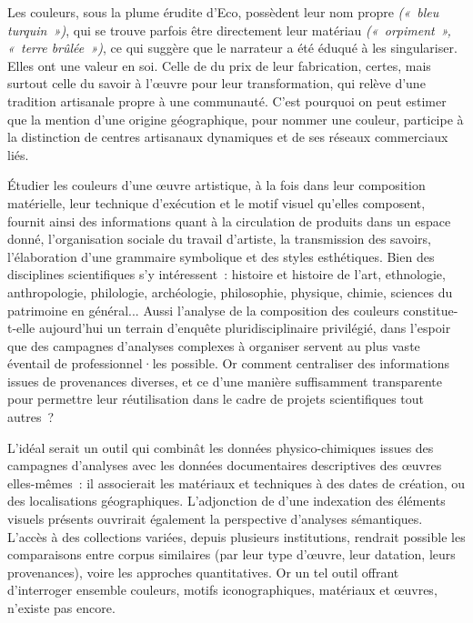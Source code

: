 \documentclass[a4paper,12pt, twoside]{book}
\begin{document}
Les couleurs, sous la plume érudite d’Eco, possèdent leur nom propre \scriptsize\textit{(«~bleu turquin~»)}\normalsize, qui se trouve parfois être directement leur matériau \scriptsize\textit{(«~orpiment~», «~terre brûlée~»)}\normalsize, ce qui suggère que le narrateur a été éduqué à les singulariser. Elles ont une valeur en soi. Celle de du prix de leur fabrication, certes, mais surtout celle du savoir à l’œuvre pour leur transformation, qui relève d’une tradition artisanale propre à une communauté. C’est pourquoi on peut estimer que la mention d’une origine géographique, pour nommer une couleur, participe à la distinction de centres artisanaux dynamiques et de ses réseaux commerciaux liés.

Étudier les couleurs d’une œuvre artistique, à la fois dans leur composition matérielle, leur technique d’exécution et le motif visuel qu’elles composent, fournit ainsi des informations quant à la circulation de produits dans un espace donné, l’organisation sociale du travail d’artiste, la transmission des savoirs, l’élaboration d’une grammaire symbolique et des styles esthétiques. Bien des disciplines scientifiques s’y intéressent~: histoire et histoire de l’art, ethnologie, anthropologie, philologie, archéologie, philosophie, physique, chimie, sciences du patrimoine en général... Aussi l’analyse de la composition des couleurs constitue-t-elle aujourd’hui un terrain d’enquête pluridisciplinaire privilégié, dans l’espoir que des campagnes d’analyses complexes à organiser servent au plus vaste éventail de professionnel·les possible. Or comment centraliser des informations issues de provenances diverses, et ce d’une manière suffisamment transparente pour permettre leur réutilisation dans le cadre de projets scientifiques tout autres~?

L’idéal serait un outil qui combinât les données physico-chimiques issues des campagnes d’analyses avec les données documentaires descriptives des œuvres elles-mêmes~: il associerait les matériaux et techniques à des dates de création, ou des localisations géographiques. L’adjonction de d’une indexation des éléments visuels présents ouvrirait également la perspective d’analyses sémantiques. L’accès à des collections variées, depuis plusieurs institutions, rendrait possible les comparaisons entre corpus similaires (par leur type d’œuvre, leur datation, leurs provenances), voire les approches quantitatives. Or un tel outil offrant d’interroger ensemble couleurs, motifs iconographiques, matériaux et œuvres, n’existe pas encore.
\end{document}
